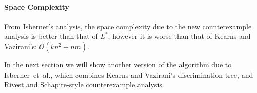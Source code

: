 \documentclass[multi,crop=false,class=article]{standalone}
\begin{document}
\paragraph{Space Complexity} From Isberner's analysis\cite{Isberner2014b}, the
space complexity due to the new counterexample analysis is better than that of
$L^*$, however it is worse than that of Kearns and Vazirani's:
$\mathcal{O}(kn^2 + nm)$.

In the next section we will show another version of the algorithm due to
Isberner~et~al., which combines Kearns and Vazirani's discrimination tree, and
Rivest and Schapire-style counterexample analysis.
\end{document}

